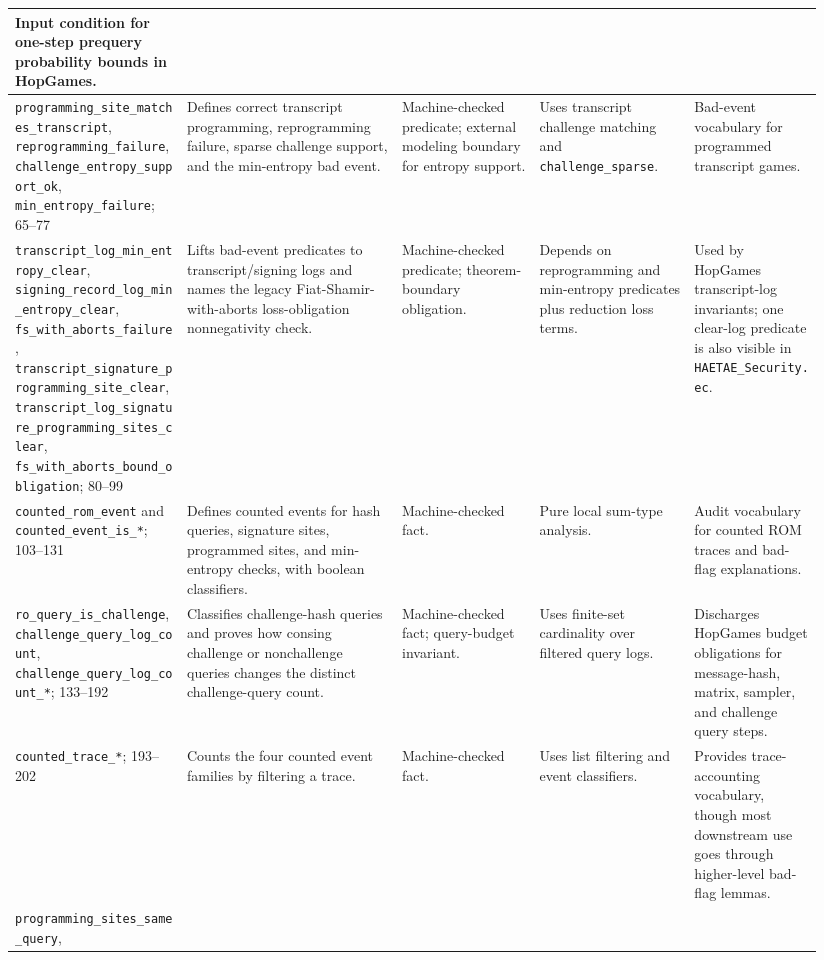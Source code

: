 \documentclass[11pt]{report}
\DeclareRobustCommand{\file}[1]{\ifmmode\text{\nolinkurl{#1}}\else\nolinkurl{#1}\fi}
\DeclareRobustCommand{\ec}[1]{\ifmmode\text{\nolinkurl{#1}}\else\nolinkurl{#1}\fi}
\theoremstyle{definition}
\theoremstyle{plain}
\begin{document}
\begin{longtable}{p{0.20\linewidth}p{0.25\linewidth}p{0.16\linewidth}p{0.18\linewidth}p{0.15\linewidth}}
Input condition for one-step prequery probability bounds in HopGames. \\
\midrule
\ec{programming\_site\_matches\_transcript},
\ec{reprogramming\_failure},
\ec{challenge\_entropy\_support\_ok},
\ec{min\_entropy\_failure}; 65--77 &
Defines correct transcript programming, reprogramming failure, sparse challenge
support, and the min-entropy bad event. &
Machine-checked predicate; external modeling boundary for entropy support. &
Uses transcript challenge matching and \ec{challenge\_sparse}. &
Bad-event vocabulary for programmed transcript games. \\
\midrule
\ec{transcript\_log\_min\_entropy\_clear},
\ec{signing\_record\_log\_min\_entropy\_clear},
\ec{fs\_with\_aborts\_failure},
\ec{transcript\_signature\_programming\_site\_clear},
\ec{transcript\_log\_signature\_programming\_sites\_clear},
\ec{fs\_with\_aborts\_bound\_obligation}; 80--99 &
Lifts bad-event predicates to transcript/signing logs and names the legacy
Fiat-Shamir-with-aborts loss-obligation nonnegativity check. &
Machine-checked predicate; theorem-boundary obligation. &
Depends on reprogramming and min-entropy predicates plus reduction loss terms. &
Used by HopGames transcript-log invariants; one clear-log predicate is also
visible in \file{HAETAE\_Security.ec}. \\
\midrule
\ec{counted\_rom\_event} and \ec{counted\_event\_is\_*}; 103--131 &
Defines counted events for hash queries, signature sites, programmed sites, and
min-entropy checks, with boolean classifiers. &
Machine-checked fact. &
Pure local sum-type analysis. &
Audit vocabulary for counted ROM traces and bad-flag explanations. \\
\midrule
\ec{ro\_query\_is\_challenge},
\ec{challenge\_query\_log\_count},
\ec{challenge\_query\_log\_count\_*}; 133--192 &
Classifies challenge-hash queries and proves how consing challenge or
nonchallenge queries changes the distinct challenge-query count. &
Machine-checked fact; query-budget invariant. &
Uses finite-set cardinality over filtered query logs. &
Discharges HopGames budget obligations for message-hash, matrix, sampler, and
challenge query steps. \\
\midrule
\ec{counted\_trace\_*}; 193--202 &
Counts the four counted event families by filtering a trace. &
Machine-checked fact. &
Uses list filtering and event classifiers. &
Provides trace-accounting vocabulary, though most downstream use goes through
higher-level bad-flag lemmas. \\
\midrule
\ec{programming\_sites\_same\_query},

\end{longtable}
\end{document}
